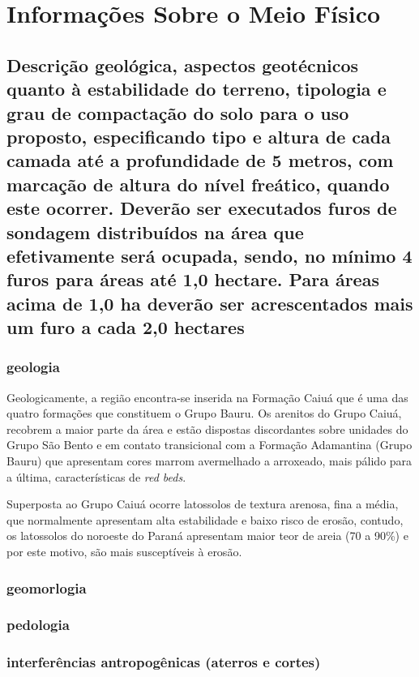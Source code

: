 \section{Informações Sobre o Meio Físico}

\subsection{Descrição geológica, aspectos geotécnicos quanto à estabilidade do terreno, tipologia e grau de compactação do solo para o uso proposto, especificando tipo e altura de cada camada até a profundidade de 5 metros, com marcação de altura do nível freático, quando este ocorrer. Deverão ser executados furos de sondagem distribuídos na área que efetivamente será ocupada, sendo, no mínimo 4 furos para áreas até 1,0 hectare. Para áreas acima de 1,0 ha deverão ser acrescentados mais um furo a cada 2,0 hectares}

\subsubsection{geologia}
Geologicamente, a região encontra-se inserida na Formação Caiuá que é uma das quatro formações que constituem o Grupo Bauru. Os arenitos do Grupo Caiuá, recobrem a maior parte da área e estão dispostas discordantes sobre unidades do Grupo São Bento e em contato transicional com a Formação Adamantina (Grupo Bauru) que apresentam cores marrom avermelhado a arroxeado, mais pálido para a última, características de \textit{red beds}.

Superposta ao Grupo Caiuá ocorre latossolos de textura arenosa, fina a média, que normalmente apresentam alta estabilidade e baixo risco de erosão, contudo, os latossolos do noroeste do Paraná apresentam maior teor de areia (70 a 90\%) e por este motivo, são mais susceptíveis à erosão.

\subsubsection{geomorlogia}

\subsubsection{pedologia}

\subsubsection{interferências antropogênicas (aterros e cortes)}

